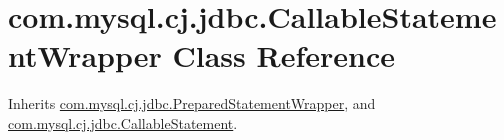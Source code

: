 \hypertarget{classcom_1_1mysql_1_1cj_1_1jdbc_1_1_callable_statement_wrapper}{}\section{com.\+mysql.\+cj.\+jdbc.\+Callable\+Statement\+Wrapper Class Reference}
\label{classcom_1_1mysql_1_1cj_1_1jdbc_1_1_callable_statement_wrapper}


Inherits \mbox{\hyperlink{classcom_1_1mysql_1_1cj_1_1jdbc_1_1_prepared_statement_wrapper}{com.\+mysql.\+cj.\+jdbc.\+Prepared\+Statement\+Wrapper}}, and \mbox{\hyperlink{classcom_1_1mysql_1_1cj_1_1jdbc_1_1_callable_statement}{com.\+mysql.\+cj.\+jdbc.\+Callable\+Statement}}.

